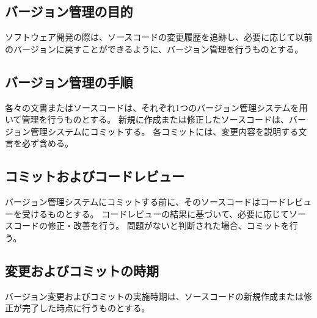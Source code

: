 \subsection{バージョン管理の目的}
ソフトウェア開発の際は、ソースコードの変更履歴を追跡し、必要に応じて以前のバージョンに戻すことができるように、バージョン管理を行うものとする。

\subsection{バージョン管理の手順}
各々の文書またはソースコードは、それぞれ1つのバージョン管理システムを用いて管理を行うものとする。
新規に作成または修正したソースコードは、バージョン管理システムにコミットする。
各コミットには、変更内容を説明する文言を必ず含める。

\subsection{コミットおよびコードレビュー}
バージョン管理システムにコミットする前に、そのソースコードはコードレビューを受けるものとする。
コードレビューの結果に基づいて、必要に応じてソースコードの修正・改善を行う。
問題がないと判断された場合、コミットを行う。

\subsection{変更およびコミットの時期}
バージョン変更およびコミットの実施時期は、ソースコードの新規作成または修正が完了した時点に行うものとする。


\clearpage

